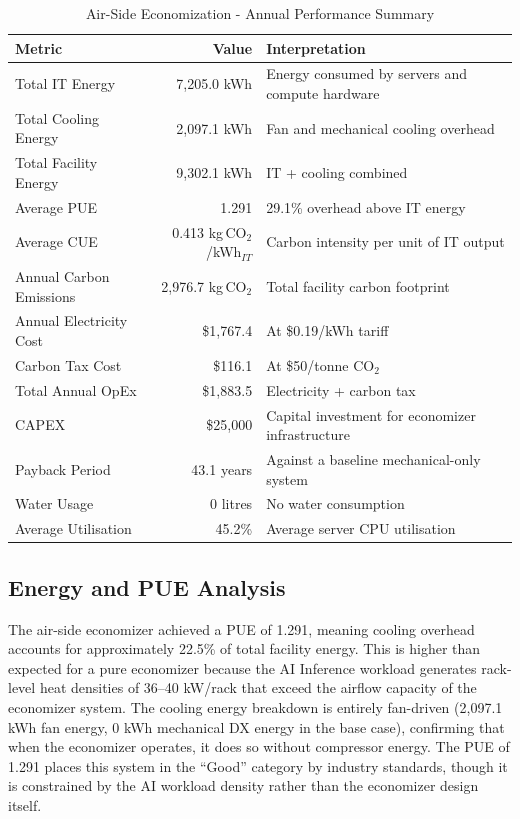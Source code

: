 ﻿\documentclass[12pt,a4paper]{report}
\begin{document}
\begin{table}[H]
\centering
\caption{Air-Side Economization - Annual Performance Summary}
\label{tab:air_annual}
\renewcommand{\arraystretch}{1.4}
\begin{tabular}{lrp{5.8cm}}
\toprule
\textbf{Metric} & \textbf{Value} & \textbf{Interpretation} \\
\midrule
Total IT Energy & 7{,}205.0 kWh & Energy consumed by servers and compute hardware \\
Total Cooling Energy & 2{,}097.1 kWh & Fan and mechanical cooling overhead \\
Total Facility Energy & 9{,}302.1 kWh & IT + cooling combined \\
Average PUE & 1.291 & 29.1\% overhead above IT energy \\
Average CUE & 0.413 kg\,CO$_2$/kWh$_{IT}$ & Carbon intensity per unit of IT output \\
Annual Carbon Emissions & 2{,}976.7 kg\,CO$_2$ & Total facility carbon footprint \\
Annual Electricity Cost & \$1{,}767.4 & At \$0.19/kWh tariff \\
Carbon Tax Cost & \$116.1 & At \$50/tonne CO$_2$ \\
Total Annual OpEx & \$1{,}883.5 & Electricity + carbon tax \\
CAPEX & \$25{,}000 & Capital investment for economizer infrastructure \\
Payback Period & 43.1 years & Against a baseline mechanical-only system \\
Water Usage & 0 litres & No water consumption \\
Average Utilisation & 45.2\% & Average server CPU utilisation \\
\bottomrule
\end{tabular}
\end{table}

\subsection{Energy and PUE Analysis}

The air-side economizer achieved a PUE of 1.291, meaning cooling overhead accounts for
approximately 22.5\% of total facility energy. This is higher than expected for a pure
economizer because the AI Inference workload generates rack-level heat densities of
36--40 kW/rack that exceed the airflow capacity of the economizer system. The cooling
energy breakdown is entirely fan-driven (2{,}097.1 kWh fan energy, 0 kWh mechanical DX
energy in the base case), confirming that when the economizer operates, it does so without
compressor energy. The PUE of 1.291 places this system in the ``Good'' category by industry
standards, though it is constrained by the AI workload density rather than the economizer
design itself.
\end{document}
